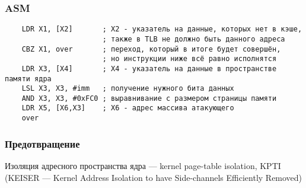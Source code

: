 \subsubsection{ASM}
\begin{frame}[fragile]{\insertsubsubsection}

  \begin{verbatim}
    LDR X1, [X2]       ; X2 - указатель на данные, которых нет в кэше,
                       ; также в TLB не должно быть данного адреса
    CBZ X1, over       ; переход, который в итоге будет совершён,
                       ; но инструкции ниже всё равно исполнятся
    LDR X3, [X4]       ; X4 - указатель на данные в пространстве памяти ядра
    LSL X3, X3, #imm   ; получение нужного бита данных
    AND X3, X3, #0xFC0 ; выравнивание с размером страницы памяти
    LDR X5, [X6,X3]    ; X6 - адрес массива атакующего
    over
  \end{verbatim}


\end{frame}

\subsubsection{Предотвращение}
\begin{frame}{\insertsubsubsection}

  \LARGE

  Изоляция адресного пространства ядра --- kernel page-table isolation, KPTI
  (KEISER --- Kernel Address Isolation to have Side-channels Efficiently
  Removed)


\end{frame}